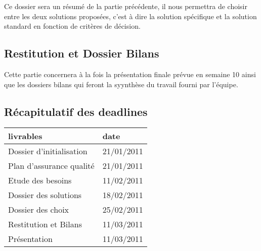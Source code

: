 Ce dossier sera un résumé de la partie précédente, il nous permettra de choisir entre les deux solutions proposées, c'est à dire la solution spécifique et la solution standard en fonction de critères de décision. 

\subsection{Restitution et Dossier Bilans}

Cette partie concernera à la fois la présentation finale prévue en semaine 10 ainsi que les dossiers bilans qui feront la syynthèse du travail fourni par l'équipe.

\subsection{Récapitulatif des deadlines}

\begin{longtable}{|l|l|}
\hline
livrables& date\\
\endhead \hline
Dossier d'initialisation& 21/01/2011\\
\hline
Plan d'assurance qualité& 21/01/2011\\
\hline
Etude des besoins& 11/02/2011\\
\hline
Dossier des solutions& 18/02/2011\\
\hline
Dossier des choix& 25/02/2011\\
\hline
Restitution et Bilans& 11/03/2011\\
\hline
Présentation&  11/03/2011\\
\hline
\end{longtable}

